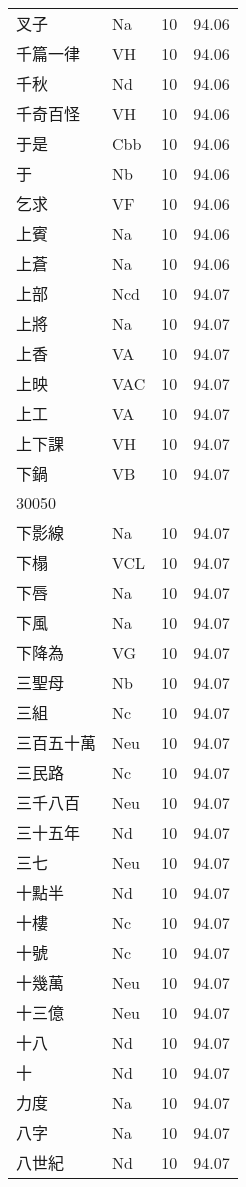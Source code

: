 \documentclass[twocolumn]{book}
\begin{document}
\begin{supertabular}{llrr}
叉子 & Na & 10 &  94.06\\
千篇一律 & VH & 10 &  94.06\\
千秋 & Nd & 10 &  94.06\\
千奇百怪 & VH & 10 &  94.06\\
于是 & Cbb & 10 &  94.06\\
于 & Nb & 10 &  94.06\\
乞求 & VF & 10 &  94.06\\
上賓 & Na & 10 &  94.06\\
上蒼 & Na & 10 &  94.06\\
上部 & Ncd & 10 &  94.07\\
上將 & Na & 10 &  94.07\\
上香 & VA & 10 &  94.07\\
上映 & VAC & 10 &  94.07\\
上工 & VA & 10 &  94.07\\
上下課 & VH & 10 &  94.07\\
下鍋 & VB & 10 &  94.07\\
30050\\
下影線 & Na & 10 &  94.07\\
下榻 & VCL & 10 &  94.07\\
下唇 & Na & 10 &  94.07\\
下風 & Na & 10 &  94.07\\
下降為 & VG & 10 &  94.07\\
三聖母 & Nb & 10 &  94.07\\
三組 & Nc & 10 &  94.07\\
三百五十萬 & Neu & 10 &  94.07\\
三民路 & Nc & 10 &  94.07\\
三千八百 & Neu & 10 &  94.07\\
三十五年 & Nd & 10 &  94.07\\
三七 & Neu & 10 &  94.07\\
十點半 & Nd & 10 &  94.07\\
十樓 & Nc & 10 &  94.07\\
十號 & Nc & 10 &  94.07\\
十幾萬 & Neu & 10 &  94.07\\
十三億 & Neu & 10 &  94.07\\
十八 & Nd & 10 &  94.07\\
十 & Nd & 10 &  94.07\\
力度 & Na & 10 &  94.07\\
八字 & Na & 10 &  94.07\\
八世紀 & Nd & 10 &  94.07\\

\end{supertabular}
\end{document}
